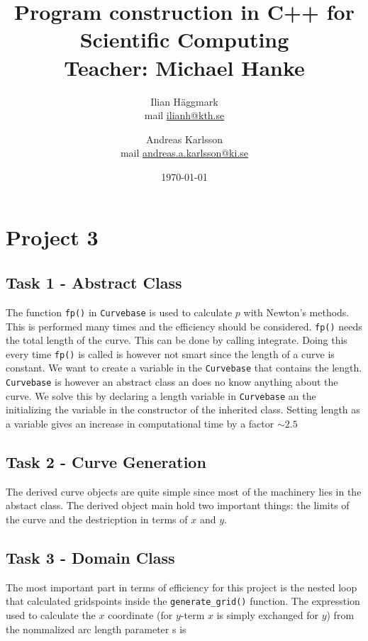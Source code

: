 \documentclass[paper=a4, fontsize=12pt]{article} %
\title{Program construction in C++ for Scientific Computing \\ Teacher: Michael Hanke}
\author{Ilian H{\"a}ggmark \\ mail \href{mailto:ilianh@kth.se}{ilianh@kth.se}
  \and Andreas Karlsson \\ mail \href{mailto:andreas.a.karlsson@ki.se}{andreas.a.karlsson@ki.se} }
\date{\normalsize\today} %
\begin{document}
\maketitle %

\section*{Project 3}
\subsection*{Task 1 - Abstract Class}

The function \texttt{fp()} in \texttt{Curvebase} is used to calculate $p$ with Newton's methods. This is performed many times and the efficiency should be considered. \texttt{fp()} needs the total length of the curve. This can be done by calling integrate. Doing this every time \texttt{fp()} is called is however not smart since the length of a curve is constant. We want to create a variable in the \texttt{Curvebase} that contains the length. \texttt{Curvebase} is however an abstract class an does no know anything about the curve. We solve this by declaring a length variable in \texttt{Curvebase} an the initializing the variable in the constructor of the inherited class. Setting length as a variable gives an increase in computational time by a factor $\sim 2.5$\\



\subsection*{Task 2 - Curve Generation}

The derived curve objects are quite simple since most of the machinery lies in the abstact class. The derived object main hold two important things: the limits of the curve and the destricption in terms of $x$ and $y$.

\subsection*{Task 3 - Domain Class}

The most important part in terms of efficiency for this project is the nested loop that calculated gridspoints inside the \texttt{generate\_grid()} function. The expresstion used to calculate the $x$ coordinate (for $y$-term $x$ is simply exchanged for $y$) from the nommalized arc length parameter s is
\end{document}
